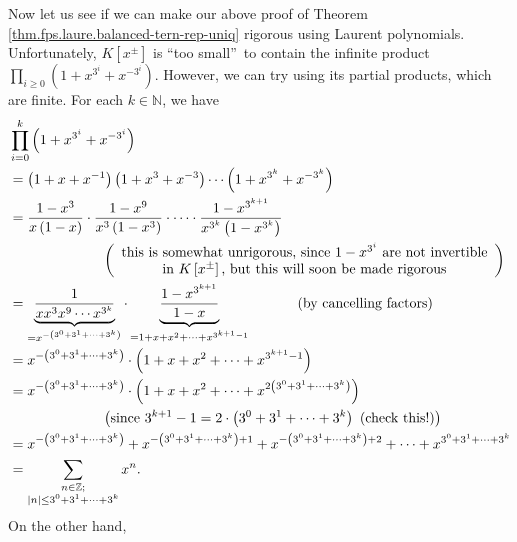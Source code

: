 Now let us see if we can make our above proof of Theorem
\ref{thm.fps.laure.balanced-tern-rep-uniq} rigorous using Laurent polynomials.
Unfortunately, $K\left[  x^{\pm}\right]  $ is \textquotedblleft too
small\textquotedblright\ to contain the infinite product $\prod_{i\geq
0}\left(  1+x^{3^{i}}+x^{-3^{i}}\right)  $. However, we can try using its
partial products, which are finite. For each $k\in\mathbb{N}$, we have%
\begin{align*}
&  \prod_{i=0}^{k}\left(  1+x^{3^{i}}+x^{-3^{i}}\right) \\
&  =\left(  1+x+x^{-1}\right)  \left(  1+x^{3}+x^{-3}\right)  \cdots\left(
1+x^{3^{k}}+x^{-3^{k}}\right) \\
&  =\dfrac{1-x^{3}}{x\left(  1-x\right)  }\cdot\dfrac{1-x^{9}}{x^{3}\left(
1-x^{3}\right)  }\cdot\cdots\cdot\dfrac{1-x^{3^{k+1}}}{x^{3^{k}}\left(
1-x^{3^{k}}\right)  }\\
&  \ \ \ \ \ \ \ \ \ \ \ \ \ \ \ \ \ \ \ \ \left(
\begin{array}
[c]{c}%
\text{this is somewhat unrigorous, since }1-x^{3^{i}}\text{ are not
invertible}\\
\text{in }K\left[  x^{\pm}\right]  \text{, but this will soon be made
rigorous}%
\end{array}
\right) \\
&  =\underbrace{\dfrac{1}{xx^{3}x^{9}\cdots x^{3^{k}}}}_{=x^{-\left(
3^{0}+3^{1}+\cdots+3^{k}\right)  }}\cdot\underbrace{\dfrac{1-x^{3^{k+1}}}%
{1-x}}_{=1+x+x^{2}+\cdots+x^{3^{k+1}-1}}\ \ \ \ \ \ \ \ \ \ \left(  \text{by
cancelling factors}\right) \\
&  =x^{-\left(  3^{0}+3^{1}+\cdots+3^{k}\right)  }\cdot\left(  1+x+x^{2}%
+\cdots+x^{3^{k+1}-1}\right) \\
&  =x^{-\left(  3^{0}+3^{1}+\cdots+3^{k}\right)  }\cdot\left(  1+x+x^{2}%
+\cdots+x^{2\left(  3^{0}+3^{1}+\cdots+3^{k}\right)  }\right) \\
&  \ \ \ \ \ \ \ \ \ \ \ \ \ \ \ \ \ \ \ \ \left(  \text{since }%
3^{k+1}-1=2\cdot\left(  3^{0}+3^{1}+\cdots+3^{k}\right)  \text{ (check
this!)}\right) \\
&  =x^{-\left(  3^{0}+3^{1}+\cdots+3^{k}\right)  }+x^{-\left(  3^{0}%
+3^{1}+\cdots+3^{k}\right)  +1}+x^{-\left(  3^{0}+3^{1}+\cdots+3^{k}\right)
+2}+\cdots+x^{3^{0}+3^{1}+\cdots+3^{k}}\\
&  =\sum_{\substack{n\in\mathbb{Z};\\\left\vert n\right\vert \leq3^{0}%
+3^{1}+\cdots+3^{k}}}x^{n}.
\end{align*}
On the other hand,%
